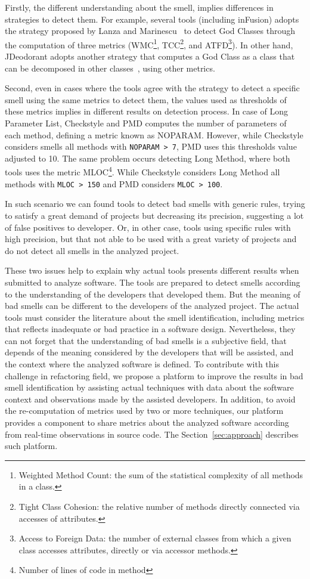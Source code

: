 \documentclass[conference]{IEEEtran}
\begin{document}
Firstly, the different understanding about the smell, implies differences in strategies to detect them. For example, several tools (including inFusion) adopts the strategy proposed by Lanza and Marinescu~\cite{Lanza:2005} to detect God Classes through the computation of three metrics (WMC\footnote{Weighted Method Count: the sum of the statistical complexity of all methods in a class.}, TCC\footnote{Tight Class Cohesion: the relative number of methods directly connected via accesses of attributes.}, and ATFD\footnote{Access to Foreign Data: the number of external classes from which a given class accesses attributes, directly or via accessor methods.}). In other hand, JDeodorant adopts another strategy that computes a God Class as a class that can be decomposed in other classes~\cite{Fontana2012c}, using other metrics. 

Second, even in cases where the tools agree with the strategy to detect a specific smell using the same metrics to detect them, the values used as thresholds of these metrics implies in different results on detection process. In case of Long Parameter List, Checkstyle and PMD computes the number of parameters of each method, defining a metric known as NOPARAM. However, while Checkstyle considers smells all methods with \texttt{NOPARAM \textgreater~7}, PMD uses this thresholds value adjusted to 10. The same problem occurs detecting Long Method, where both tools uses the metric MLOC\footnote{Number of lines of code in method}. While Checkstyle considers Long Method all methods with \texttt{MLOC \textgreater~150} and PMD considers \texttt{MLOC \textgreater~100}. 

In such scenario we can found tools to detect bad smells with generic rules, trying to satisfy a great demand of projects but decreasing its precision, suggesting a lot of false positives to developer. Or, in other case, tools using specific rules with high precision, but that not able to be used with a great variety of projects and do not detect all smells in the analyzed project.

These two issues help to explain why actual tools presents different results when submitted to analyze software. The tools are prepared to detect smells according to the understanding of the developers that developed them. But the meaning of bad smells can be different to the developers of the analyzed project. The actual tools must consider the literature about the smell identification, including metrics that reflects inadequate or bad practice in a software design. Nevertheless, they can not forget that the understanding of bad smells is a subjective field, that depends of the meaning considered by the developers that will be assisted, and the context where the analyzed software is defined. To contribute with this challenge in refactoring field, we propose a platform to improve the results in bad smell identification by assisting actual techniques with data about the software context and observations made by the assisted developers. In addition, to avoid the re-computation of metrics used by two or more techniques, our platform provides a component to share metrics about the analyzed software according from real-time observations in source code. The Section~\ref{sec:approach} describes such platform.
\end{document}
